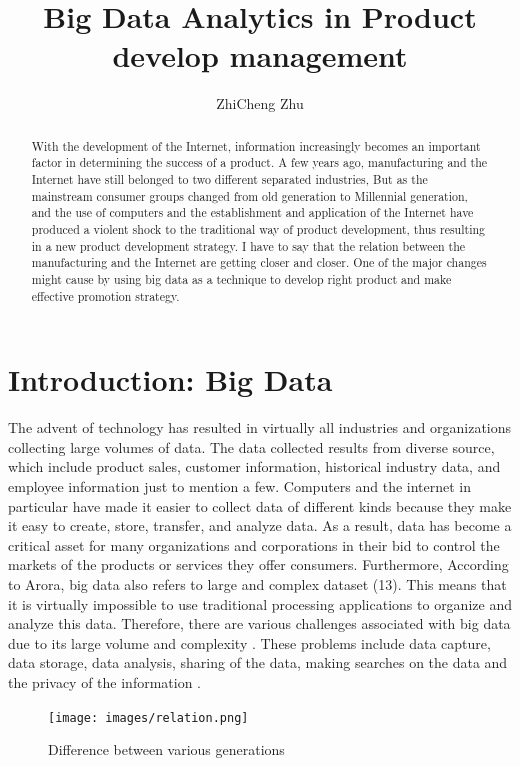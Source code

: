 \documentclass[sigconf]{acmart}
\begin{document}
\title{Big Data Analytics in Product develop management}


\author{ZhiCheng Zhu}


\begin{abstract}

    With the development of the Internet, information increasingly becomes an important factor in determining the success of a product. A few years ago, manufacturing and the Internet have still belonged to two different separated industries, But as the mainstream consumer groups changed from old generation to Millennial generation, and the use of computers and the establishment and application of the Internet have produced a violent shock to the traditional way of product development, thus resulting in a new product development strategy. I have to say that the relation between the manufacturing and the Internet are getting closer and closer. One of the major changes might cause by using big data as a technique to develop right product and make effective promotion strategy.
    
\end{abstract}


\maketitle

\section{Introduction: Big Data}
The advent of technology has resulted in virtually all industries and organizations collecting large volumes of data. The data collected results from diverse source, which include product sales, customer information, historical industry data, and employee information just to mention a few. Computers and the internet in particular have made it easier to collect data of different kinds because they make it easy to create, store, transfer, and analyze data. As a result, data has become a critical asset for many organizations and corporations in their bid to control the markets of the products or services they offer consumers. Furthermore, According to Arora, big data also refers to large and complex dataset (13). This means that it is virtually impossible to use traditional processing applications to organize and analyze this data. Therefore, there are various challenges associated with big data due to its large volume and complexity \cite{Arora2016}. These problems include data capture, data storage, data analysis, sharing of the data, making searches on the data and the privacy of the information \cite{Sivarajah2017}.
\begin{figure}[!ht]
  \centering\texttt{[image: images/relation.png]}
  \caption{Difference between various generations \cite{part-reg}}
  \label{Figure 3}
\end{figure}
\end{document}

